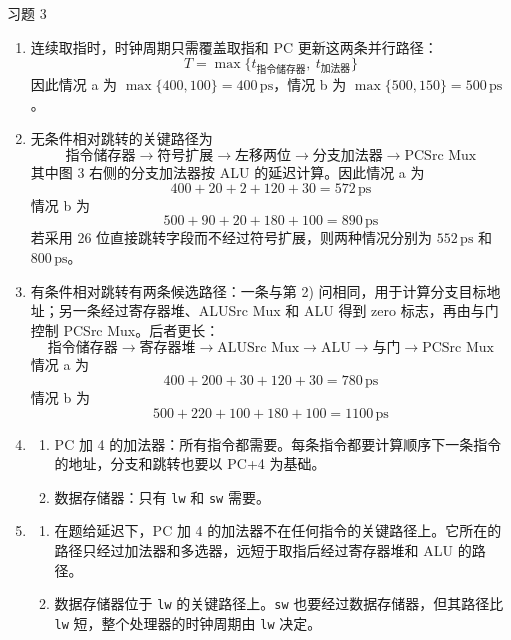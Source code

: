 \begin{problem}
    习题 3
    \begin{solution}
        \begin{enumerate}
            \item[\textbf{1)}] 连续取指时，时钟周期只需覆盖取指和 PC 更新这两条并行路径：
            $$
            T = \max\{t_{\text{指令储存器}},\ t_{\text{加法器}}\}
            $$
            因此情况 a 为 $\max\{400,100\}=400\,\mathrm{ps}$，情况 b 为 $\max\{500,150\}=500\,\mathrm{ps}$。

            \item[\textbf{2)}] 无条件相对跳转的关键路径为
            $$
            \text{指令储存器} \to \text{符号扩展} \to \text{左移两位} \to \text{分支加法器} \to \text{PCSrc Mux}
            $$
            其中图 3 右侧的分支加法器按 ALU 的延迟计算。因此情况 a 为
            $$
            400 + 20 + 2 + 120 + 30 = 572\,\mathrm{ps}
            $$
            情况 b 为
            $$
            500 + 90 + 20 + 180 + 100 = 890\,\mathrm{ps}
            $$
            若采用 26 位直接跳转字段而不经过符号扩展，则两种情况分别为 $552\,\mathrm{ps}$ 和 $800\,\mathrm{ps}$。

            \item[\textbf{3)}] 有条件相对跳转有两条候选路径：一条与第 2) 问相同，用于计算分支目标地址；另一条经过寄存器堆、ALUSrc Mux 和 ALU 得到 zero 标志，再由与门控制 PCSrc Mux。后者更长：
            $$
            \text{指令储存器} \to \text{寄存器堆} \to \text{ALUSrc Mux} \to \text{ALU} \to \text{与门} \to \text{PCSrc Mux}
            $$
            情况 a 为
            $$
            400 + 200 + 30 + 120 + 30 = 780\,\mathrm{ps}
            $$
            情况 b 为
            $$
            500 + 220 + 100 + 180 + 100 = 1100\,\mathrm{ps}
            $$

            \item[\textbf{4)}] 
            \begin{enumerate}
                \item[\textbf{a)}] PC 加 4 的加法器：所有指令都需要。每条指令都要计算顺序下一条指令的地址，分支和跳转也要以 PC+4 为基础。
                \item[\textbf{b)}] 数据存储器：只有 \texttt{lw} 和 \texttt{sw} 需要。
            \end{enumerate}

            \item[\textbf{5)}] 
            \begin{enumerate}
                \item[\textbf{a)}] 在题给延迟下，PC 加 4 的加法器不在任何指令的关键路径上。它所在的路径只经过加法器和多选器，远短于取指后经过寄存器堆和 ALU 的路径。
                \item[\textbf{b)}] 数据存储器位于 \texttt{lw} 的关键路径上。\texttt{sw} 也要经过数据存储器，但其路径比 \texttt{lw} 短，整个处理器的时钟周期由 \texttt{lw} 决定。
            \end{enumerate}


\end{enumerate}
\end{solution}
\end{problem}
